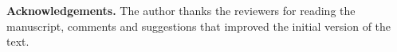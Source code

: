 \documentclass[12pt,a4paper,oneside]{article}
\def \newsection{\vspace{12pt}\textbf}
\begin{document}
\vspace{12pt}

{\bf Acknowledgements.} The author thanks the reviewers for reading the manuscript, comments and suggestions that improved the initial version of the text.


%
%




\end{document}
